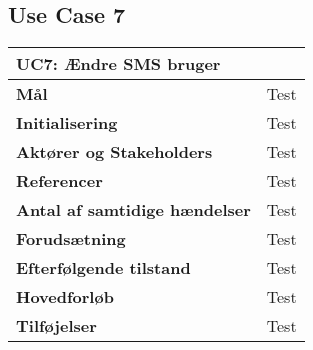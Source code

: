 \subsection{Use Case 7}
\begin{table}[htbp] \centering
\begin{tabular}{|l|l|} %
	\hline
\multicolumn{2}{|l|}{\textbf{UC7: Ændre SMS bruger}} \\\hline
\textbf{Mål}								&Test \\\hline
\textbf{Initialisering}					&Test \\\hline
\textbf{Aktører og Stakeholders}			&Test \\\hline
\textbf{Referencer}						&Test \\\hline
\textbf{Antal af samtidige hændelser}	&Test \\\hline
\textbf{Forudsætning}					&Test \\\hline
\textbf{Efterfølgende tilstand}			&Test \\\hline
\textbf{Hovedforløb}						&Test \\\hline
\textbf{Tilføjelser}						&Test \\\hline
	\end{tabular}
	\label{UC7} 
\end{table}